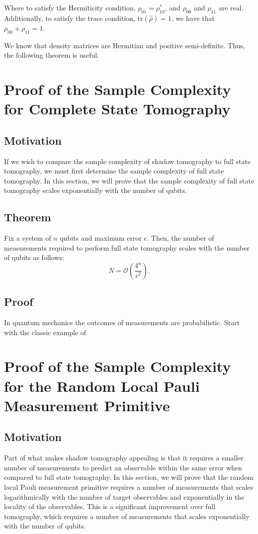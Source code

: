\documentclass[12pt]{article}
\begin{document}
    Where to satisfy the Hermiticity condition, $\rho_{01} = \rho_{10}^*$, and $\rho_{00}$ and $\rho_{11}$ are real. Additionally, to satisfy the trace condition, $\text{tr}(\hat{\rho}) = 1$, we have that $\rho_{00} + \rho_{11} = 1$. 
    
    We know that density matrices are Hermitian and positive semi-definite. Thus, the following theorem is useful.
    \begin{theorem}
        
    \end{theorem}

    \section{Proof of the Sample Complexity for Complete State Tomography}
    \subsection{Motivation}
    If we wish to compare the sample complexity of shadow tomography to full state tomography, we must first determine the sample complexity of full state tomography. In this section, we will prove that the sample complexity of full state tomography scales exponentially with the number of qubits.

    \subsection{Theorem}
    Fix a system of $n$ qubits and maximum error $\epsilon$. Then, the number of measurements required to perform full state tomography scales with the number of qubits as follows:
    \begin{equation*}
        N = \mathcal{O}\left(\frac{4^n}{\epsilon^2}\right).
    \end{equation*}

    \subsection{Proof}
    In quantum mechanics the outcomes of measurements are probabilistic. Start with the classic example of 

    \section{Proof of the Sample Complexity for the Random Local Pauli Measurement Primitive}
    \subsection{Motivation}
    Part of what makes shadow tomography appealing is that it requires a smaller number of measurements to predict an observable within the same error when compared to full state tomography. In this section, we will prove that the random local Pauli measurement primitive requires a number of measurements that scales logarithmically with the number of target observables and exponentially in the locality of the observables. This is a significant improvement over full tomography, which requires a number of measurements that scales exponentially with the number of qubits.
\end{document}
